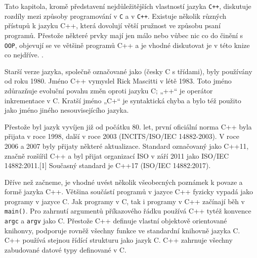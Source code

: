     Tato kapitola, kromě představení nejdůležitějších vlastností jazyka \texttt{C++}, diskutuje
    rozdíly mezi způsoby programování v \texttt{C} a v \texttt{C++}. Existuje několik různých
    přístupů k jazyku C++, která dovolují větší pružnost ve způsobu psaní programů. Přestože některé
    prvky mají jen málo nebo vůbec nic co do činění s \texttt{OOP}, objevují se ve většině programů
    C++ a je vhodné diskutovat je v této knize co nejdříve. \cite[p.~20]{Schildt}.

    \begin{description}[noitemsep]
      \item[C with Classes:] Starší verze jazyka, společně označované jako  (česky C s třídami), byly používány od roku 1980. Jméno C++ vymyslel Rick Mascitti
        v létě 1983. Toto jméno zdůrazňuje evoluční povahu změn oproti jazyku C; „++“ je operátor
        inkrementace v C. Kratší jméno „C+“ je syntaktická chyba a bylo též použito jako jméno
        jiného nesouvisejícího jazyka.
      \item[Standardy C++:] Přestože byl jazyk vyvíjen již od počátku 80. let, první oficiální norma
        C++ byla přijata v roce 1998, další v roce 2003 (INCITS/ISO/IEC 14882-2003). V roce 2006 a
        2007 byly přijaty některé aktualizace. Standard označovaný jako C++11, značně rozšířil C++ a
        byl přijat organizací ISO v září 2011 jako ISO/IEC 14882:2011.[1] Současný standard je C++17
        (ISO/IEC 14882:2017).
    \end{description}

    Dříve než začneme, je vhodné uvést několik všeobecných poznámek k povaze a formě jazyka C++.
    Většina součástí programů v jazyce C++ fyzicky vypadá jako programy v jazyce C. Jak programy v
    C, tak i programy v C++ začínají běh v \lstinline[style=luaCPPText]!main()!. Pro zahrnutí
    argumentů příkazového řádku používá C++ tytéž konvence \lstinline[style=luaCPPText]!argc! a
    \lstinline[style=luaCPPText]!argv! jako C. Přestože C++ definuje vlastní objektově orientované
    knihonvy, podporuje rovněž všechny funkce ve standardní knihovně jazyka C. C++ používá stejnou
    řídící strukturu jako jazyk C. C++ zahrnuje všechny zabudované datové typy definované v C. 


